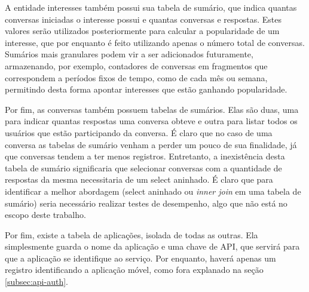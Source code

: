 \documentclass[diss]{template/setrem}
\begin{document}
A entidade interesses também possui sua tabela de sumário, que indica quantas conversas iniciadas o interesse possui e quantas conversas e respostas. Estes valores serão utilizados posteriormente para calcular a popularidade de um interesse, que por enquanto é feito utilizando apenas o número total de conversas. Sumários mais granulares podem vir a ser adicionados futuramente, armazenando, por exemplo, contadores de conversas em fragmentos que correspondem a períodos fixos de tempo, como de cada mês ou semana, permitindo desta forma apontar interesses que estão ganhando popularidade.

Por fim, as conversas também possuem tabelas de sumários. Elas são duas, uma para indicar quantas respostas uma conversa obteve e outra para listar todos os usuários que estão participando da conversa. É claro que no caso de uma conversa as tabelas de sumário venham a perder um pouco de sua finalidade, já que conversas tendem a ter menos registros. Entretanto, a inexistência desta tabela de sumário significaria que selecionar conversas com a quantidade de respostas da mesma necessitaria de um select aninhado. É claro que para identificar a melhor abordagem (select aninhado ou \emph{inner join} em uma tabela de sumário) seria necessário realizar testes de desempenho, algo que não está no escopo deste trabalho.

Por fim, existe a tabela de aplicações, isolada de todas as outras. Ela simplesmente guarda o nome da aplicação e uma chave de API, que servirá para que a aplicação se identifique ao serviço. Por enquanto, haverá apenas um registro identificando a aplicação móvel, como fora explanado na seção \ref{subsec:api-auth}.
\end{document}
